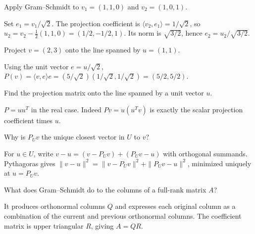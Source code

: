 \begin{problem}\label{prob:i14-problem-01}
Apply Gram–Schmidt to $v_1=(1,1,0)$ and $v_2=(1,0,1)$.
\end{problem}
\begin{solution}
Set $e_1=v_1/\sqrt2$. The projection coefficient is $\langle v_2,e_1\rangle=1/\sqrt2$, so $u_2=v_2-\frac12(1,1,0)=(1/2,-1/2,1)$. Its norm is $\sqrt{3/2}$, hence $e_2=u_2/\sqrt{3/2}$.
\end{solution}

\begin{problem}\label{prob:i14-problem-02}
Project $v=(2,3)$ onto the line spanned by $u=(1,1)$.
\end{problem}
\begin{solution}
Using the unit vector $e=u/\sqrt2$, $P(v)=\langle v,e\rangle e=(5/\sqrt2)(1/\sqrt2,1/\sqrt2)=(5/2,5/2)$.
\end{solution}

\begin{problem}\label{prob:i14-problem-03}
Find the projection matrix onto the line spanned by a unit vector $u$.
\end{problem}
\begin{solution}
$P=uu^T$ in the real case. Indeed $Pv=u(u^Tv)$ is exactly the scalar projection coefficient times $u$.
\end{solution}

\begin{problem}\label{prob:i14-problem-04}
Why is $P_Uv$ the unique closest vector in $U$ to $v$?
\end{problem}
\begin{solution}
For $u\in U$, write $v-u=(v-P_Uv)+(P_Uv-u)$ with orthogonal summands. Pythagoras gives $\|v-u\|^2=\|v-P_Uv\|^2+\|P_Uv-u\|^2$, minimized uniquely at $u=P_Uv$.
\end{solution}

\begin{problem}[QR factorization]\label{prob:i14-problem-05}
What does Gram–Schmidt do to the columns of a full-rank matrix $A$?
\end{problem}
\begin{solution}
It produces orthonormal columns $Q$ and expresses each original column as a combination of the current and previous orthonormal columns. The coefficient matrix is upper triangular $R$, giving $A=QR$.
\end{solution}

